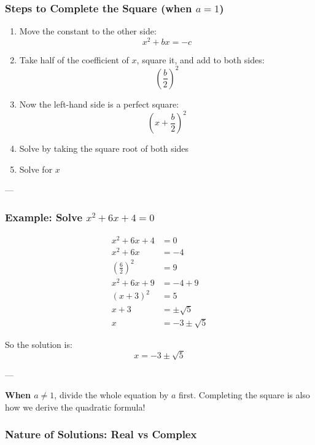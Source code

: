\documentclass[11pt]{article}
\begin{document}
\subsubsection*{Steps to Complete the Square (when \( a = 1 \))}

\begin{enumerate}
  \item Move the constant to the other side:
    \[
    x^2 + bx = -c
    \]
  \item Take half of the coefficient of \( x \), square it, and add to both sides:
    \[
    \left( \frac{b}{2} \right)^2
    \]
  \item Now the left-hand side is a perfect square:
    \[
    \left( x + \frac{b}{2} \right)^2
    \]
  \item Solve by taking the square root of both sides
  \item Solve for \( x \)
\end{enumerate}

---

\subsubsection*{Example: Solve \( x^2 + 6x + 4 = 0 \)}

\begin{align*}
x^2 + 6x + 4 &= 0 \\
x^2 + 6x &= -4 \\
\left( \frac{6}{2} \right)^2 &= 9 \\
x^2 + 6x + 9 &= -4 + 9 \\
(x + 3)^2 &= 5 \\
x + 3 &= \pm \sqrt{5} \\
x &= -3 \pm \sqrt{5}
\end{align*}

So the solution is:
\[
x = -3 \pm \sqrt{5}
\]

---

\begin{tcolorbox}[title=Tip for Completing the Square, colback=yellow!5!white, colframe=yellow!80!black]
\textbf{When \( a \ne 1 \)}, divide the whole equation by \( a \) first.
Completing the square is also how we derive the quadratic formula!
\end{tcolorbox}

\subsubsection*{Nature of Solutions: Real vs Complex}
\end{document}
